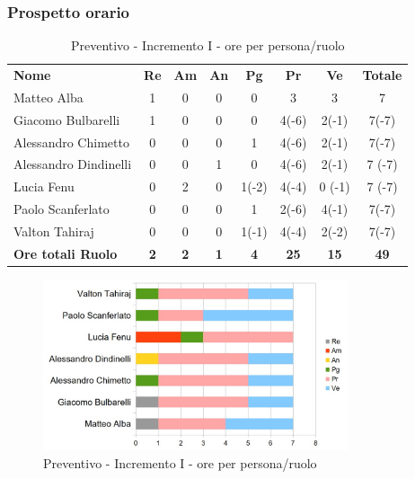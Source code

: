 \subsubsection{Prospetto orario}

\begin{table} [h!]
	\begin{center}
		\begin{tabular} { m{3.5cm} c c c c c c c }
			\rowcolor{lightgray}
			\textbf{Nome} & \textbf{Re} & \textbf{Am} & \textbf{An} & \textbf{Pg} & \textbf{Pr} & \textbf{Ve} & \textbf{Totale} \\
			Matteo Alba & 1 & 0 & 0 & 0 & 3 & 3 & 7 \\
			Giacomo Bulbarelli & 1 & 0 & 0 & 0 & 4(-6) & 2(-1) & 7(-7) \\
			Alessandro Chimetto & 0 & 0 & 0 & 1 & 4(-6) & 2(-1) & 7(-7) \\
			Alessandro Dindinelli & 0 & 0 & 1 & 0 & 4(-6) & 2(-1) & 7 (-7)\\
			Lucia Fenu & 0 & 2 & 0 & 1(-2) & 4(-4) & 0 (-1)& 7 (-7)\\
			Paolo Scanferlato & 0 & 0 & 0 & 1 & 2(-6) & 4(-1) & 7(-7) \\
			Valton Tahiraj & 0 & 0 & 0 & 1(-1) & 4(-4) & 2(-2) & 7(-7) \\
			\textbf{Ore totali Ruolo} & \textbf{2} & \textbf{2} & \textbf{1} & \textbf{4} & \textbf{25}& \textbf{15} & \textbf{49}
		\end{tabular}
		\caption{Preventivo - Incremento I - ore per persona/ruolo}
	\end{center}
\end{table}
\begin{figure} [h!]
	\centering
	\includegraphics[width=0.8\textwidth]{res/img/grafici/Incremento1Ore.jpg}
	\caption{Preventivo - Incremento I - ore per persona/ruolo} 
\end{figure}

